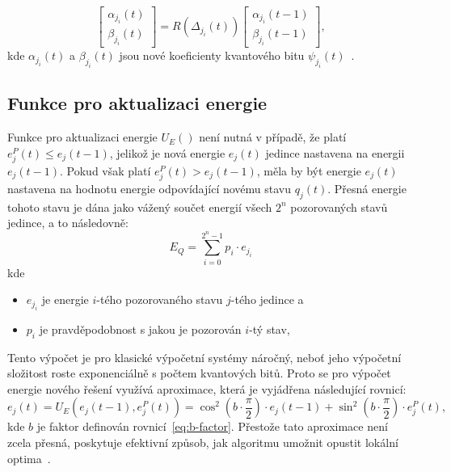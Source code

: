 \begin{equation*}
    \begin{bmatrix}
        \alpha_{j_i}\left(t\right) \\
        \beta_{j_i}\left(t\right)
    \end{bmatrix}
    =
    R\left(\Delta_{j_i}\left(t\right)\right)
    \begin{bmatrix}
        \alpha_{j_i}\left(t-1\right) \\
        \beta_{j_i}\left(t-1\right) 
    \end{bmatrix},
\end{equation*}
kde $\alpha_{j_i}\left(t\right)$ a $\beta_{j_i}\left(t\right)$ jsou nové koeficienty kvantového bitu $\psi_{j_i}\left(t\right)$~\cite{qisa}.

\subsection{Funkce pro aktualizaci energie}\label{subsec:qisa-upd}
Funkce pro aktualizaci energie $U_E\left(\right)$ není nutná v případě, že platí $e^P_j\left(t\right) \leq e_j\left(t-1\right)$, jelikož je nová energie $e_j\left(t\right)$ jedince nastavena na energii $e_j\left(t-1\right)$. 
Pokud však platí $e^P_j\left(t\right) > e_j\left(t-1\right)$, měla by být energie $e_j\left(t\right)$ nastavena na hodnotu energie odpovídající novému stavu $q_j\left(t\right)$. 
Přesná energie tohoto stavu je dána jako vážený součet energií všech $2^n$ pozorovaných stavů jedince, a to následovně:
\begin{equation*}
    E_Q = \sum_{i=0}^{2^n-1} p_i \cdot e_{j_i}
\end{equation*}
kde 
\begin{itemize}
    \item $e_{j_i}$ je energie $i$-tého pozorovaného stavu $j$-tého jedince a
    \item $p_i$ je pravděpodobnost s jakou je pozorován $i$-tý stav,
\end{itemize}
Tento výpočet je pro klasické výpočetní systémy náročný, neboť jeho výpočetní složitost roste exponenciálně s počtem kvantových bitů. 
Proto se pro výpočet energie nového řešení využívá aproximace, která je vyjádřena následující rovnicí:
\begin{equation*}
    e_j\left(t\right) = U_E\left(e_j\left(t-1\right), e^P_j\left(t\right)\right) = \cos^2{\left(b \cdot \frac{\pi}{2}\right)} \cdot e_j\left(t-1\right) + \sin^2{\left(b \cdot \frac{\pi}{2}\right)} \cdot e^P_j\left(t\right),
\end{equation*}
kde $b$ je faktor definován rovnicí~\ref{eq:b-factor}. 
Přestože tato aproximace není zcela přesná, poskytuje efektivní způsob, jak algoritmu umožnit opustit lokální optima~\cite{qisa}. 


